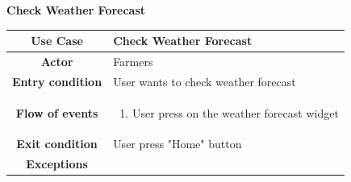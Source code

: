 \documentclass[table, 12pt]{article}
\begin{document}
\begin{itemize}
            \begin{table}[H]
                \item[] \textbf{Check Weather Forecast}
                \item[] 
                \centering
                \begin{tabular}{|c |m{}|}
                    \hline
                    \textbf{Use Case} & Check Weather Forecast\\ \hline
                    \textbf{Actor} & Farmers\\ \hline
                    \textbf{Entry condition} & User wants to check weather forecast\\  \hline
                    \textbf{Flow of events} & \begin{enumerate}
                                                \item User press on the weather forecast widget
                                            \end{enumerate}\\ \hline
                    \textbf{Exit condition} & User press "Home" button\\ \hline
                    \textbf{Exceptions} & \\ \hline                    
                \end{tabular}
            \end{table}


\end{itemize}
\end{document}
